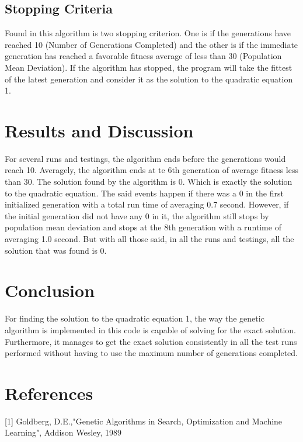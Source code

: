 \documentclass{acm_proc_article-sp}
\begin{document}
\subsection{Stopping Criteria}
Found in this algorithm is two stopping criterion. One is if the generations have reached 10 (Number of Generations Completed) and the other is if the immediate generation has reached a favorable fitness average of less than 30 (Population Mean Deviation). If the algorithm has stopped, the program will take the fittest of the latest generation and consider it as the solution to the quadratic equation 1.

\section{Results and Discussion}
For several runs and testings, the algorithm ends before the generations would reach 10. Averagely, the algorithm ends at te 6th generation of average fitness less than 30. The solution found by the algorithm is 0. Which is exactly the solution to the quadratic equation. The said events happen if there was a 0 in the first initialized generation with a total run time of averaging 0.7 second. However, if the initial generation did not have any 0 in it, the algorithm still stops by population mean deviation and stops at the 8th generation with a runtime of averaging 1.0 second. But with all those said, in all the runs and testings, all the solution that was found is 0.

\section{Conclusion}
For finding the solution to the quadratic equation 1, the way the genetic algorithm is implemented in this code is capable of solving for the exact solution. Furthermore, it manages to get the exact solution consistently in all the test runs performed without having to use the maximum number of generations completed.

\section{References}
[1] Goldberg, D.E.,"Genetic Algorithms in Search, Optimization and Machine Learning", Addison Wesley, 1989
\end{document}
